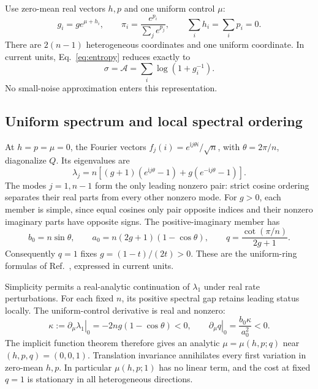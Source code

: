\documentclass[aps,pre,onecolumn,11pt,notitlepage,nofootinbib]{revtex4-2}
\begin{document}
Use zero-mean real vectors $h,p$ and one uniform control $\mu$:
\begin{equation}
 g_i=g e^{\mu+h_i},\qquad
 \pi_i=\frac{e^{p_i}}{\sum_j e^{p_j}},\qquad
 \sum_i h_i=\sum_i p_i=0.
 \label{eq:coordinates}
\end{equation}
There are $2(n-1)$ heterogeneous coordinates and one uniform coordinate. In current units, Eq.~\eqref{eq:entropy} reduces exactly to
\begin{equation}
 \sigma=\mathcal A=\sum_i\log(1+g_i^{-1}).
 \label{eq:affinityflow}
\end{equation}
No small-noise approximation enters this representation.

\subsection{Uniform spectrum and local spectral ordering}
At $h=p=\mu=0$, the Fourier vectors $f_j(i)=e^{\mathrm{i}j\theta i}/\sqrt n$, with $\theta=2\pi/n$, diagonalize $Q$. Its eigenvalues are
\begin{equation}
 \lambda_j=n\left[(g+1)(e^{\mathrm{i}j\theta}-1)+g(e^{-\mathrm{i}j\theta}-1)\right].
 \label{eq:fourier}
\end{equation}
The modes $j=1,n-1$ form the only leading nonzero pair: strict cosine ordering separates their real parts from every other nonzero mode. For $g>0$, each member is simple, since equal cosines only pair opposite indices and their nonzero imaginary parts have opposite signs. The positive-imaginary member has
\begin{equation}
 b_0=n\sin\theta,\qquad
 a_0=n(2g+1)(1-\cos\theta),\qquad
 q=\frac{\cot(\pi/n)}{2g+1}.
 \label{eq:uniform}
\end{equation}
Consequently $q=1$ fixes $g=(1-t)/(2t)>0$. These are the uniform-ring formulas of Ref.~\cite{OBS2022}, expressed in current units.

Simplicity permits a real-analytic continuation of $\lambda_1$ under real rate perturbations. For each fixed $n$, its positive spectral gap retains leading status locally. The uniform-control derivative is real and nonzero:
\begin{equation}
 \kappa:=\left.\partial_\mu\lambda_1\right|_0
       =-2ng(1-\cos\theta)<0,\qquad
 \left.\partial_\mu q\right|_0=\frac{b_0\kappa}{a_0^2}<0.
 \label{eq:control}
\end{equation}
The implicit function theorem therefore gives an analytic $\mu=\mu(h,p;q)$ near $(h,p,q)=(0,0,1)$. Translation invariance annihilates every first variation in zero-mean $h,p$. In particular $\mu(h,p;1)$ has no linear term, and the cost at fixed $q=1$ is stationary in all heterogeneous directions.
\end{document}
